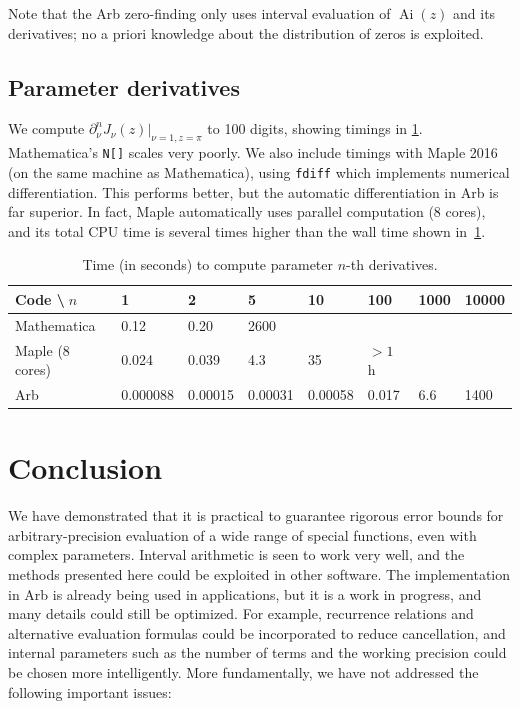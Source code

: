 \documentclass[11pt]{article}
\begin{document}
Note that the Arb zero-finding only uses interval evaluation
of $\operatorname{Ai}(z)$ and its derivatives; 
no a priori knowledge about the distribution of zeros
is exploited.

\subsection{Parameter derivatives}

We compute $\partial_{\nu}^n J_{\nu}(z) \vert_{\nu=1,z=\pi}$ to 100 digits,
showing timings in \cref{tab:paramderiv}.
Mathematica's \texttt{N[]} scales very poorly.
We also include timings with Maple 2016 (on the same machine as Mathematica),
using \texttt{fdiff} which implements numerical differentiation.
This performs better, but the automatic
differentiation in Arb is far superior.
In fact, Maple automatically uses parallel computation (8 cores), and its total CPU
time is several times higher than the wall time shown in~\cref{tab:paramderiv}.

\begin{table}[h!]
\renewcommand{\arraystretch}{1.1}
\setlength{\tabcolsep}{.4em}
\begin{center}
\begin{small}
\begin{tabular}{l | l l l l l l l}
Code \textbackslash $\;n$      & 1 & 2 & 5 & 10 & 100 & 1000 & 10000  \\ \hline
Mathematica     & 0.12     & 0.20    & 2600    &         &       &     &        \\
Maple (8 cores) & 0.024    & 0.039   & 4.3     & 35       & $>1$ h   &     &        \\
Arb             & 0.000088 & 0.00015 & 0.00031 & 0.00058 & 0.017 & 6.6 & 1400
\end{tabular}
\end{small}
\caption{Time (in seconds) to compute parameter $n$-th derivatives.}
\label{tab:paramderiv}
\end{center}
\end{table}

\section{Conclusion}

We have demonstrated that it is practical
to guarantee rigorous error bounds for arbitrary-precision evaluation
of a wide range of special functions, even with complex parameters.
Interval arithmetic is seen to work very well, and the methods
presented here could be exploited in other software.
The implementation in Arb is already being used in applications,
but it is a work in progress, and many details could still be optimized.
For example, recurrence relations and alternative evaluation formulas
could be incorporated to reduce cancellation,
and internal parameters such as the number of terms
and the working precision could be chosen more intelligently.
More fundamentally, we have not addressed the following important issues:
\end{document}
